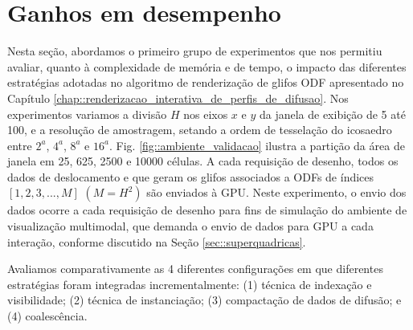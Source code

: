 \section{Ganhos em desempenho}
\label{sec::funcionalidades_agregadas_e_ganhos_de_performance}

Nesta seção, abordamos o primeiro grupo de experimentos que nos permitiu avaliar, quanto à complexidade de memória e de tempo, o impacto das diferentes estratégias adotadas no algoritmo de renderização de glifos ODF apresentado no Capítulo \ref{chap::renderizacao_interativa_de_perfis_de_difusao}.
Nos experimentos variamos a divisão $H$ nos eixos $x$ e $y$ da janela de exibição de 5 até 100, e a resolução de amostragem, setando a ordem de tesselação do icosaedro entre $2^a$, $4^a$, $8^a$ e $16^a$. Fig. \ref{fig::ambiente_validacao} ilustra a partição da área de janela em 25, 625, 2500 e 10000 células. A cada requisição de desenho, todos os dados de deslocamento e que geram os glifos associados a ODFs de índices $[1, 2, 3, ..., M]$ $(M = H^2)$ são enviados à GPU. Neste experimento, o envio dos dados ocorre a cada requisição de desenho para fins de simulação do ambiente de visualização multimodal, que demanda o envio de dados para GPU a cada interação, conforme discutido na Seção \ref{sec::superquadricas}.

 Avaliamos comparativamente as 4 diferentes configurações em que diferentes estratégias foram integradas incrementalmente: (1) técnica de indexação e visibilidade; (2) técnica de instanciação; (3) compactação de dados de difusão; e (4) coalescência.
 



